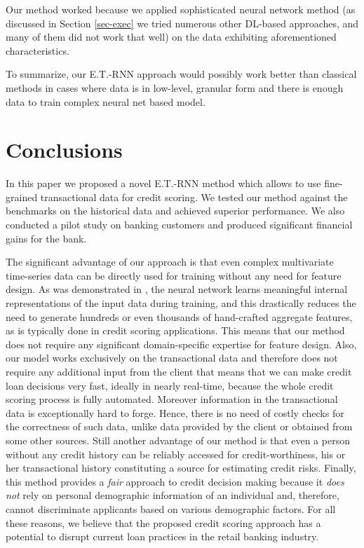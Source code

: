 \documentclass[sigconf]{acmart}
\begin{document}
Our method worked because we applied sophisticated neural network method (as discussed in Section \ref{sec-exec} we tried numerous other DL-based approaches, and many of them did not work that well) on the data exhibiting aforementioned characteristics.

To summarize, our E.T.-RNN approach would possibly work better than classical methods in cases where data is in low-level, granular form and there is enough data to train complex neural net based model.

\section{Conclusions}

In this paper we proposed a novel E.T.-RNN method which allows to use fine-grained transactional data for credit scoring.
We tested our method against the benchmarks on the historical data and achieved superior performance. We also conducted a pilot study on banking customers and produced significant financial gains for the bank.

The significant advantage of our approach is that even complex multivariate time-series data can be directly used for training without any need for feature design. As was demonstrated in \cite{erhan2009visualizing}, the neural network learns meaningful internal representations of the input data during training, and this drastically reduces the need to generate hundreds or even thousands of hand-crafted aggregate features, as is typically done in credit scoring applications. This means that our method does not require any significant domain-specific expertise for feature design.
Also, our model works exclusively on the transactional data and therefore does not require any additional input from the client that means that we can make credit loan decisions very fast, ideally in nearly real-time, because the whole credit scoring process is fully automated.
Moreover information in the transactional data is exceptionally hard to forge. Hence, there is no need of costly checks for the correctness of such data, unlike data provided by the client or obtained from some other sources.
Still another advantage of our method is that even a person without any credit history can be reliably accessed for credit-worthiness, his or her transactional history constituting a source for estimating credit risks.
Finally, this method provides a \textit{fair} approach to credit decision making because it \textit{does not} rely on personal demographic information of an individual and, therefore, cannot discriminate applicants based on various demographic factors.
For all these reasons, we believe that the proposed credit scoring approach has a potential to disrupt current loan practices in the retail banking industry.
\end{document}
